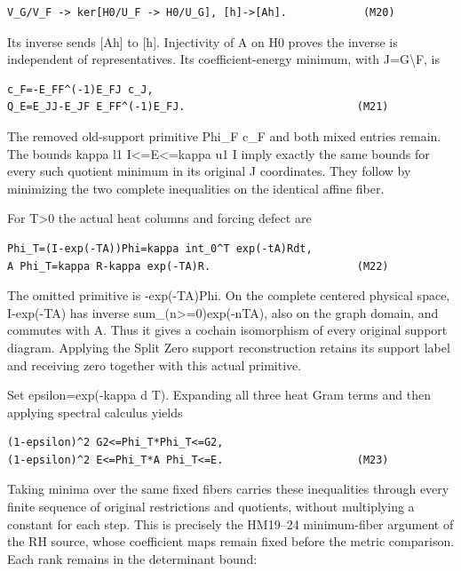 \documentclass[11pt,a4paper]{article}
\renewcommand{\[}{\begingroup\small\originaldisplaystart}
\renewcommand{\]}{\originaldisplayend\endgroup}
\begin{document}
\begin{verbatim}
V_G/V_F -> ker[H0/U_F -> H0/U_G], [h]->[Ah].            (M20)
\end{verbatim}

Its inverse sends {[}Ah{]} to {[}h{]}. Injectivity of A on H0 proves the
inverse is independent of representatives. Its coefficient-energy
minimum, with J=G\textbackslash F, is

\begin{verbatim}
c_F=-E_FF^(-1)E_FJ c_J,
Q_E=E_JJ-E_JF E_FF^(-1)E_FJ.                           (M21)
\end{verbatim}

The removed old-support primitive Phi\_F c\_F and both mixed entries
remain. The bounds kappa l1 I\textless=E\textless=kappa u1 I imply
exactly the same bounds for every such quotient minimum in its original
J coordinates. They follow by minimizing the two complete inequalities
on the identical affine fiber.

For T\textgreater0 the actual heat columns and forcing defect are

\begin{verbatim}
Phi_T=(I-exp(-TA))Phi=kappa int_0^T exp(-tA)Rdt,
A Phi_T=kappa R-kappa exp(-TA)R.                       (M22)
\end{verbatim}

The omitted primitive is -exp(-TA)Phi. On the complete centered physical
space, I-exp(-TA) has inverse
{s\allowbreak{}u\allowbreak{}m\allowbreak{}\_\allowbreak{}(\allowbreak{}n\allowbreak{}\textgreater{}\allowbreak{}=\allowbreak{}0\allowbreak{})\allowbreak{}e\allowbreak{}x\allowbreak{}p\allowbreak{}(\allowbreak{}-\allowbreak{}n\allowbreak{}T\allowbreak{}A\allowbreak{})\allowbreak{},\allowbreak{}}
also on the graph domain, and commutes with A. Thus it gives a cochain
isomorphism of every original support diagram. Applying the Split Zero
support reconstruction retains its support label and receiving zero
together with this actual primitive.

Set epsilon=exp(-kappa d T). Expanding all three heat Gram terms and
then applying spectral calculus yields

\begin{verbatim}
(1-epsilon)^2 G2<=Phi_T*Phi_T<=G2,
(1-epsilon)^2 E<=Phi_T*A Phi_T<=E.                     (M23)
\end{verbatim}

Taking minima over the same fixed fibers carries these inequalities
through every finite sequence of original restrictions and quotients,
without multiplying a constant for each step. This is precisely the
HM19--24 minimum-fiber argument of the RH source, whose coefficient maps
remain fixed before the metric comparison. Each rank remains in the
determinant bound:
\end{document}
